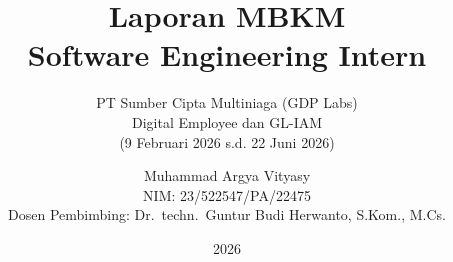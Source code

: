 \usepackage{array}
\usepackage{booktabs}
\usepackage{fix-cm}
\usepackage{tikz}
\usetikzlibrary{positioning,fit,calc,arrows.meta}
\usepackage{listings}


\title{Laporan MBKM\texorpdfstring{\\}{}
Software Engineering Intern}
\subtitle{PT Sumber Cipta Multiniaga (GDP Labs)\texorpdfstring{\\[2pt]}{, }
Digital Employee dan GL-IAM\texorpdfstring{\\[2pt]}{, }
(9 Februari 2026 s.d. 22 Juni 2026)}
\author{Muhammad Argya Vityasy\texorpdfstring{\\[3pt]}{, }
NIM: 23/522547/PA/22475\texorpdfstring{\\[2pt]}{, }
Dosen Pembimbing: Dr.\ techn.\ Guntur Budi Herwanto, S.Kom., M.Cs.}
\date{2026}

